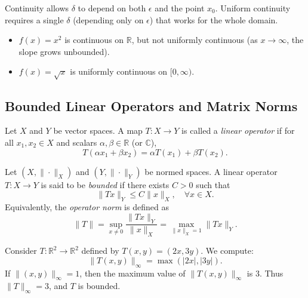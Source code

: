 \begin{remark}
Continuity allows $\delta$ to depend on both $\epsilon$ and the point $x_0$.  
Uniform continuity requires a single $\delta$ (depending only on $\epsilon$) that works for the whole domain.  
\end{remark}

\begin{example}
\begin{itemize}
    \item $f(x) = x^2$ is continuous on $\mathbb{R}$, but not uniformly continuous (as $x \to \infty$, the slope grows unbounded).  
    \item $f(x) = \sqrt{x}$ is uniformly continuous on $[0,\infty)$.  
\end{itemize}
\end{example}

\subsection{Bounded Linear Operators and Matrix Norms}

\begin{definition}
Let $X$ and $Y$ be vector spaces.  
A map $T:X \to Y$ is called a \emph{linear operator} if for all $x_1,x_2 \in X$ and scalars $\alpha,\beta \in \mathbb{R}$ (or $\mathbb{C}$),
\[
T(\alpha x_1 + \beta x_2) = \alpha T(x_1) + \beta T(x_2).
\]
\end{definition}

\begin{definition}
Let $(X,\|\cdot\|_X)$ and $(Y,\|\cdot\|_Y)$ be normed spaces.  
A linear operator $T:X \to Y$ is said to be \emph{bounded} if there exists $C>0$ such that
\[
\|Tx\|_Y \leq C \|x\|_X, \quad \forall x \in X.
\]
Equivalently, the \emph{operator norm} is defined as
\[
\|T\| = \sup_{x \neq 0} \frac{\|Tx\|_Y}{\|x\|_X} 
= \max_{\|x\|_X = 1} \|Tx\|_Y.
\]
\end{definition}

\begin{example}
Consider $T:\mathbb{R}^2 \to \mathbb{R}^2$ defined by $T(x,y) = (2x,3y)$.  
We compute:
\[
\|T(x,y)\|_\infty = \max(|2x|,|3y|).
\]
If $\|(x,y)\|_\infty = 1$, then the maximum value of $\|T(x,y)\|_\infty$ is $3$.  
Thus $\|T\|_\infty = 3$, and $T$ is bounded.  
\end{example}

